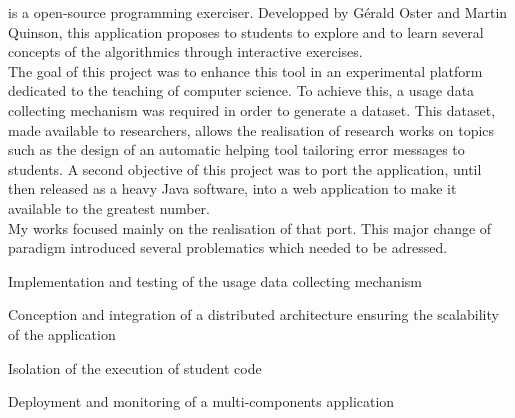 \begin{minipage}{\dimexpr\textwidth-0.5cm}
\href{http://people.irisa.fr/Martin.Quinson/Teaching/PLM/}{}
is a open-source programming exerciser.
Developped by Gérald Oster and Martin Quinson, this application proposes to students
to explore and to learn several concepts of the algorithmics through interactive exercises.
\\
The goal of this project was to enhance this tool in an experimental platform dedicated
to the teaching of computer science.
To achieve this, a usage data collecting mechanism was required in order to generate a dataset.
This dataset, made available to researchers, allows the realisation of research works on topics
such as the design of an automatic helping tool tailoring error messages to students.
A second objective of this project was to port the application, until then released as
a heavy Java software, into a web application to make it available to the greatest number.
\\
My works focused mainly on the realisation of that port.
This major change of paradigm introduced several problematics which needed to be adressed.
\begin{tightemize}
    \item Implementation and testing of the usage data collecting mechanism
    \item Conception and integration of a distributed architecture ensuring the scalability of the application
    \item Isolation of the execution of student code
    \item Deployment and monitoring of a multi-components application
\end{tightemize}
\sectionsep\xdef\tpd{\the\prevdepth}
\end{minipage}

\sectionsep

